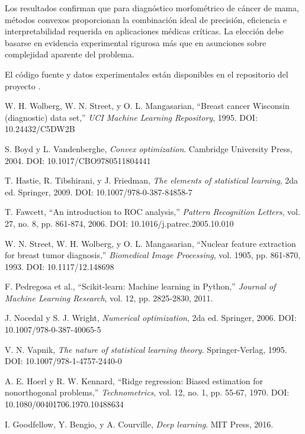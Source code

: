 \documentclass[conference]{IEEEtran}
\begin{document}
Los resultados confirman que para diagnóstico morfométrico de cáncer de mama, métodos convexos proporcionan la combinación ideal de precisión, eficiencia e interpretabilidad requerida en aplicaciones médicas críticas. La elección debe basarse en evidencia experimental rigurosa más que en asunciones sobre complejidad aparente del problema.

El código fuente y datos experimentales están disponibles en el repositorio del proyecto \cite{repositorio2024}.

\begin{thebibliography}{00}
 W. H. Wolberg, W. N. Street, y O. L. Mangasarian, ``Breast cancer Wisconsin (diagnostic) data set,'' \textit{UCI Machine Learning Repository}, 1995. DOI: 10.24432/C5DW2B

 S. Boyd y L. Vandenberghe, \textit{Convex optimization}. Cambridge University Press, 2004. DOI: 10.1017/CBO9780511804441

 T. Hastie, R. Tibshirani, y J. Friedman, \textit{The elements of statistical learning}, 2da ed. Springer, 2009. DOI: 10.1007/978-0-387-84858-7

 T. Fawcett, ``An introduction to ROC analysis,'' \textit{Pattern Recognition Letters}, vol. 27, no. 8, pp. 861-874, 2006. DOI: 10.1016/j.patrec.2005.10.010

 W. N. Street, W. H. Wolberg, y O. L. Mangasarian, ``Nuclear feature extraction for breast tumor diagnosis,'' \textit{Biomedical Image Processing}, vol. 1905, pp. 861-870, 1993. DOI: 10.1117/12.148698

 F. Pedregosa et al., ``Scikit-learn: Machine learning in Python,'' \textit{Journal of Machine Learning Research}, vol. 12, pp. 2825-2830, 2011.

 J. Nocedal y S. J. Wright, \textit{Numerical optimization}, 2da ed. Springer, 2006. DOI: 10.1007/978-0-387-40065-5

 V. N. Vapnik, \textit{The nature of statistical learning theory}. Springer-Verlag, 1995. DOI: 10.1007/978-1-4757-2440-0

 A. E. Hoerl y R. W. Kennard, ``Ridge regression: Biased estimation for nonorthogonal problems,'' \textit{Technometrics}, vol. 12, no. 1, pp. 55-67, 1970. DOI: 10.1080/00401706.1970.10488634

 I. Goodfellow, Y. Bengio, y A. Courville, \textit{Deep learning}. MIT Press, 2016.


\end{thebibliography}
\end{document}

